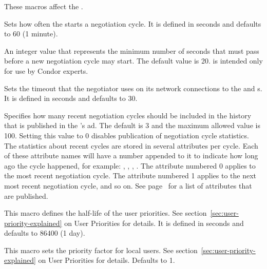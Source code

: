 These macros affect the .
\begin{description}
  
\label{param:NegotiatorInterval}
\item[\Macro{NEGOTIATOR\_INTERVAL}]
  Sets how often the  starts a negotiation cycle.
  It is defined in seconds and defaults to 60 (1 minute).
  
\label{param:NegotiatorCycleDelay}
\item[\Macro{NEGOTIATOR\_CYCLE\_DELAY}]
  An integer value that represents the minimum number of seconds
  that must pass before a new negotiation cycle may start.
  The default value is 20.
   is intended only for use by
  Condor experts.

\label{param:NegotiatorTimeout}
\item[\Macro{NEGOTIATOR\_TIMEOUT}]
  Sets the timeout that the negotiator uses on its network connections
  to the  and s.
  It is defined in seconds and defaults to 30.

\label{param:NegotiationCycleStatsLength}
\item[\Macro{NEGOTIATION\_CYCLE\_STATS\_LENGTH}] Specifies how many
  recent negotiation cycles should be included in the history that is
  published in the 's ad.  The default is 3 and the
  maximum allowed value is 100.  Setting this value to 0 disables
  publication of negotiation cycle statistics.  The
  statistics about recent cycles are stored in several attributes per
  cycle.  Each of these attribute names will have a number appended to
  it to indicate how long ago the cycle happened, for example:
  ,
  ,
  , \Dots.  The attribute
  numbered 0 applies to the most recent negotiation cycle.  The
  attribute numbered 1 applies to the next most recent negotiation
  cycle, and so on.  See
  page~\pageref{attr:LastNegotiationCycleActiveSubmitterCount<X>} for a
  list of attributes that are published.

\label{param:PriorityHalfLife}
\item[\Macro{PRIORITY\_HALFLIFE}]
  This macro defines the half-life of the user priorities.  See
  section~\ref{sec:user-priority-explained}
  on User Priorities for details.  It is defined in seconds and defaults
  to 86400 (1 day).

\label{param:DefaultPrioFactor} 
\item[\Macro{DEFAULT\_PRIO\_FACTOR}]
  This macro sets the priority factor for local users. See
  section~\ref{sec:user-priority-explained}
  on User Priorities for details.  Defaults to 1.


\end{description}
